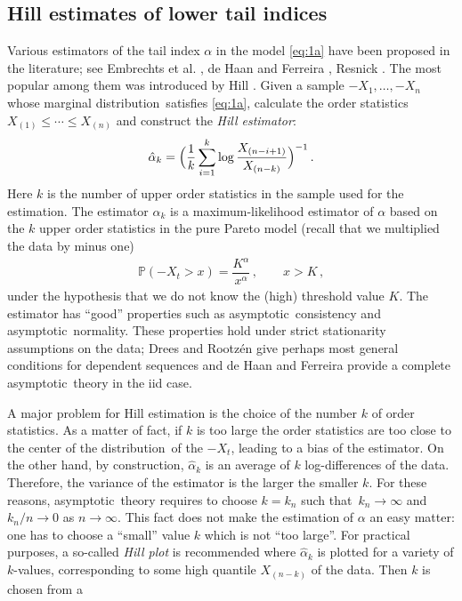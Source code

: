 \documentclass[11pt,a4]{amsart}
\newcommand{\asy}{asymptotic}
\newcommand{\beao}{\begin{eqnarray*}}
\newcommand{\eeao}{\end{eqnarray*}\noindent}
\newcommand{\beam}{\begin{eqnarray}}
\newcommand{\eeam}{\end{eqnarray}\noindent}
\newcommand{\nto}{n\to\infty}
\newcommand{\st}{such that}
\newcommand{\ds}{distribution}
\newcommand{\seq}{sequence}
\renewcommand{\P }{{\mathbb P}}
\newcommand{\1}{{\mathbf 1}}
\begin{document}
\subsection{Hill estimates of lower tail indices}\label{sec:Hill}
Various estimators of the tail index $\alpha$  in the model
\eqref{eq:1a} have been proposed in the literature;
see Embrechts et al. \cite{embrechts:klueppelberg:mikosch:1997}, de
Haan and Ferreira \cite{haan:ferreira:2006}, Resnick
\cite{resnick:2007}. The most popular among them was introduced  by
Hill \cite{hill1975simple}.
Given a sample $-X_1,\ldots,-X_n$ whose marginal \ds\ satisfies  \eqref{eq:1a}, calculate
the order statistics $X_{(1)}\le \cdots\le X_{(n)}$  and construct the
{\em Hill estimator}:
\beao%
  \hat \alpha_k = \Big(
    {1 \over k} \sum_{i=1}^k \log {X_{(n-i+1)} \over X_{(n-k)}}
    \Big)^{-1}\,.
\eeao
Here $k$  is the number of upper order statistics in the sample used
for the estimation. The estimator $\hat \alpha_k$ is 
a maximum-likelihood estimator of $\alpha$ based on the $k$ upper
order statistics in the pure Pareto model (recall that 
we multiplied the data by minus one)
\beam\label{eq:3}
\P(-X_t>x)= \dfrac{K^\alpha}{x^\alpha}\,,\qquad x>K\,,
\eeam
under the hypothesis that we do not know the (high) threshold value
$K$. The estimator has ``good'' properties such as 
\asy\ consistency and \asy\ normality. These properties hold under
strict stationarity assumptions on the data; Drees and Rootz\'en 
\cite{drees:rootzen:2010} give perhaps most general conditions for
dependent \seq s and de Haan and Ferreira \cite{haan:ferreira:2006} provide
a complete \asy\ theory in the iid case.
\par
A major problem for Hill estimation is the choice of the number $k$ of
order statistics. As  a matter of fact,
if $k$ is too large the order statistics are too close to the center
of the \ds\ of the $-X_t$, leading to a bias
of the estimator. On the other hand, by construction, $\hat \alpha_k$ is an average of $k$ log-differences of the 
data. Therefore, the variance of the estimator is the larger the
smaller $k$. For these reasons, \asy\ theory requires 
to choose $k=k_n$ \st\ $k_n\to\infty$ and $k_n/n\to 0$ as $\nto$. This
fact does not make the estimation of $\alpha$ an  
easy matter: one has to choose a ``small'' value $k$ which is not
``too large''. For practical purposes,
a so-called {\em Hill plot} is recommended where $\hat \alpha_k$ is
plotted for a variety of $k$-values, corresponding to
some high  quantile $X_{(n-k)}$ of the data. Then $k$ is chosen from a
\end{document}
